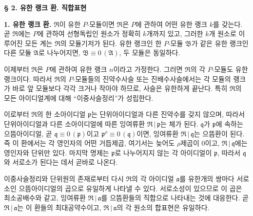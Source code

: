 \begin{center}
\textbf{§ 2. 유한 랭크 환. 직합표현}
\end{center}

\textbf{1. 유한 랭크 환.} \(\mathfrak R\)이 유한 \(P\)-모듈이면 \(\mathfrak R\)은 \(P\)에 관하여 어떤 유한 랭크 \(k\)를 갖는다. 곧 \(\mathfrak R\)에는 \(P\)에 관하여 선형독립인 원소가 정확히 \(k\)개까지 있고, 그러한 \(k\)개 원소로 이루어진 모든 계는 \(\mathfrak R\)의 모듈기저가 된다. 유한 랭크인 한 \(P\)-모듈 \(\mathfrak B\)가 같은 유한 랭크인 다른 모듈 \(\mathfrak A\)로 나누어지면, \(\mathfrak B\equiv0\,(\mathfrak A)\), 두 모듈은 동일하다.

이제부터 \(\mathfrak R\)은 \(P\)에 관하여 유한 랭크 \(n\)이라고 가정한다. 그러면 \(\mathfrak R\)의 각 \(P\)-모듈도 유한 랭크이다. 따라서 \(\mathfrak R\)의 \(P\)-모듈들의 진약수사슬 또는 진배수사슬에서는 각 모듈의 랭크가 바로 앞 모듈보다 각각 크거나 작아야 하므로, 사슬은 유한하게 끝난다. 특히 \(\mathfrak R\)의 모든 아이디얼계에 대해 “이중사슬정리”가 성립한다.

이로부터 \(\mathfrak R\)의 한 소아이디얼 \(\mathfrak p\)는 단위아이디얼과 다른 진약수를 갖지 않으며, 따라서 단위아이디얼과 다른 소아이디얼에 따른 잉여류환 \(\mathfrak R\,|\,\mathfrak p\)는 체가 된다. \(\mathfrak q\)가 \(\mathfrak p\)에 속하는 으뜸아이디얼, 곧 \(\mathfrak q\equiv0\,(\mathfrak p)\)이고 \(\mathfrak p^\rho\equiv0\,(\mathfrak q)\)이면, 잉여류환 \(\mathfrak R\,|\,\mathfrak q\)는 으뜸환이 된다. 즉 이 환에서는 각 영인자의 어떤 거듭제곱, 여기서는 늦어도 \(\rho\)제곱이 0이고, \(\mathfrak R\,|\,\mathfrak q\)에는 영인자와 단위만 있다. 마지막 명제는 \(\mathfrak p\)로 나누어지지 않는 각 아이디얼이 \(\mathfrak p\), 따라서 \(\mathfrak q\)와 서로소가 된다는 데서 곧바로 나온다.

이중사슬정리와 단위원의 존재로부터 다시 \(\mathfrak R\)의 각 아이디얼 \(\mathfrak a\)를 유한개의 쌍마다 서로소인 으뜸아이디얼의 곱으로 유일하게 나타낼 수 있다. 서로소성이 있으므로 이 곱은 최소공배수와 같고, 잉여류환 \(\mathfrak R\,|\,\mathfrak a\)를 으뜸환들의 직합으로 나타내는 것에 대응한다. 곧 \(\mathfrak R\,|\,\mathfrak a\)는 이 환들의 최대공약수이고, \(\mathfrak R\,|\,\mathfrak a\)의 각 원소의 합표현은 유일하다.

